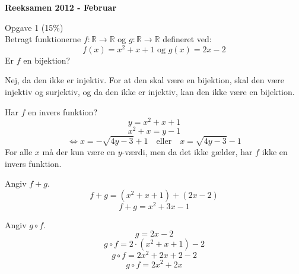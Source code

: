 \begin{center}
    \huge\bfseries Reeksamen 2012 - Februar \\
\end{center}

Opgave 1 (15\%) \\

Betragt funktionerne $f:\mathbb{R}\to\mathbb{R}$ og $g:\mathbb{R}\to\mathbb{R}$ defineret ved:
\[ f(x)=x^2+x+1 \text{ og } g(x)=2x-2 \]
Er $f$ en bijektion?

Nej, da den ikke er injektiv. For at den skal være en bijektion, skal den være injektiv og surjektiv, og da den ikke er injektiv, kan den ikke være en bijektion.

Har $f$ en invers funktion?
\[ y=x^2+x+1 \]
\[ x^2+x=y-1 \]
\[ \iff x = -\sqrt{4y-3}+1 \quad \text{eller} \quad x = \sqrt{4y-3}-1 \]
For alle $x$ må der kun være en $y$-værdi, men da det ikke gælder, har $f$ ikke en invers funktion.

Angiv $f+g$.
\[ f+g=(x^2+x+1)+(2x-2) \]
\[ f+g=x^2+3x-1 \]

Angiv $g \circ f$.
\[ g=2x-2 \]
\[ g \circ f=2\cdot(x^2+x+1)-2 \]
\[ g \circ f=2x^2+2x+2-2 \]
\[ g \circ f=2x^2+2x \]